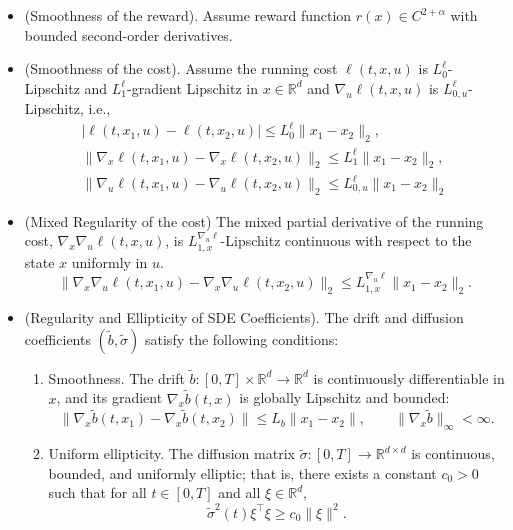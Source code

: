 \documentclass[11pt]{article}
\def\w{\widetilde}
\begin{document}
\begin{itemize}
\item[(H4)](Smoothness of the reward). Assume reward function $r(x) \in C^{2+\alpha}$ with bounded second-order derivatives.

\item[(H5)](Smoothness of the cost). Assume the running cost $\ell(t,x,u)$ is $L^\ell_
0$-Lipschitz and $L^\ell_
1$-gradient Lipschitz in $x \in \mathbb{R}^d$ and $\nabla_u\ell(t,x,u)$ is $L^\ell_
{0,u}$-Lipschitz, i.e.,
\begin{equation}
\begin{aligned}
|\ell(t,x_1,u) - \ell(t,x_2,u)| \le L^\ell_
0 \|x_1 - x_2\|_2 ,\\
\|\nabla_x \ell(t,x_1,u) - \nabla_x \ell(t,x_2,u)\|_2 \le L^\ell_1 \|x_1 - x_2\|_2 ,\\
\| \nabla_u \ell(t, x_1, u) - \nabla_u \ell(t, x_2, u) \|_2 \le L_{0,u}^\ell \|x_1 - x_2\|_2
\end{aligned}
\end{equation}

\item[(H6)] (Mixed Regularity of the cost) The mixed partial derivative of the running cost, $\nabla_x \nabla_u \ell(t, x, u)$, is  $L_{1,x}^{\nabla_u \ell}$-Lipschitz continuous with respect to the state $x$ uniformly in $u$.
\begin{equation}
\| \nabla_x \nabla_u \ell(t, x_1, u) - \nabla_x \nabla_u \ell(t, x_2, u) \|_2 \le L_{1,x}^{\nabla_u \ell} \|x_1 - x_2\|_2.
\end{equation}

\item[(H7)] (Regularity and Ellipticity of SDE Coefficients). 
The drift and diffusion coefficients $(\w b,\w\sigma)$ satisfy the following conditions:
\begin{enumerate}
\item Smoothness.  
The drift $\w b:[0,T]\times\mathbb{R}^d\to\mathbb{R}^d$ is continuously differentiable in $x$,  
and its gradient $\nabla_x \w b(t,x)$ is globally Lipschitz and bounded:
\[
\|\nabla_x \w b(t,x_1)-\nabla_x \w b(t,x_2)\|
\le L_b \|x_1-x_2\|,\qquad
\|\nabla_x \w b\|_\infty<\infty.
\]
\item Uniform ellipticity.  
The diffusion matrix $\w\sigma:[0,T]\to\mathbb{R}^{d\times d}$ is continuous, bounded, and uniformly elliptic;  
that is, there exists a constant $c_0>0$ such that for all $t\in[0,T]$ and all $\xi\in\mathbb{R}^d$,
\[
\w\sigma^{2}(t)\xi^\top\xi \ge c_0 \|\xi\|^2.
\]
\end{enumerate}

\end{itemize}
\end{document}
